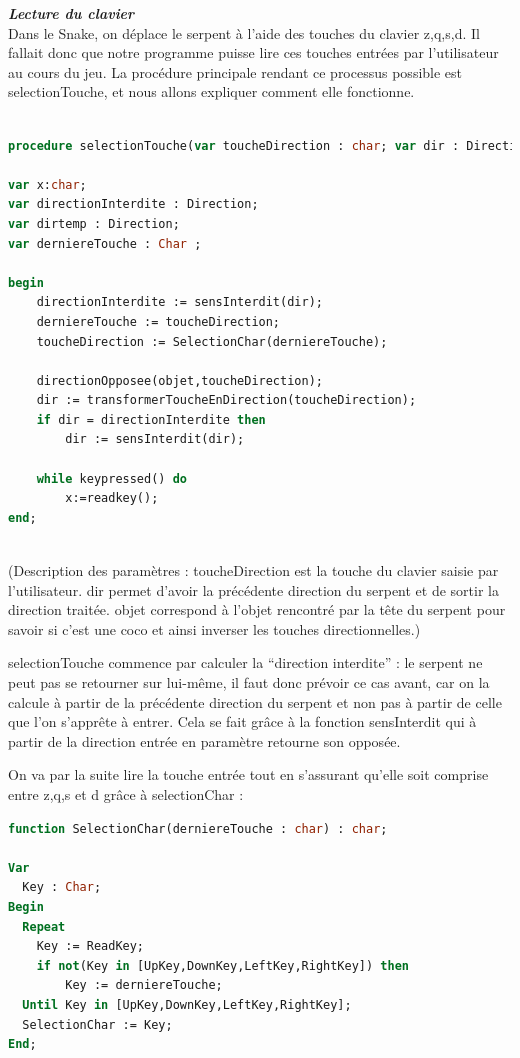 \documentclass[11pt,a4paper]{article}
\begin{document}
         \textit{\textbf{Lecture du clavier}}\\
        
        Dans le Snake, on déplace le serpent à l’aide des touches du clavier z,q,s,d. Il fallait donc que notre programme puisse lire ces touches entrées par l’utilisateur au cours du jeu. La procédure principale rendant ce processus possible est selectionTouche, et nous allons expliquer comment elle fonctionne.
        \scriptsize
                 \begin{lstlisting}[language=Pascal,frame=single,caption=Code source de la procédure selectionTouche]
                 
procedure selectionTouche(var toucheDirection : char; var dir : Direction; objet : Contenus);

var x:char;
var directionInterdite : Direction;
var dirtemp : Direction;
var derniereTouche : Char ;

begin
	directionInterdite := sensInterdit(dir); 
	derniereTouche := toucheDirection;
	toucheDirection := SelectionChar(derniereTouche);

	directionOpposee(objet,toucheDirection);							  
	dir := transformerToucheEnDirection(toucheDirection); 
	if dir = directionInterdite then 
		dir := sensInterdit(dir);	
		
	while keypressed() do 
		x:=readkey();	  
end;
                 
                \end{lstlisting}
         \normalsize

(Description des paramètres :         
toucheDirection est la touche du clavier saisie par l'utilisateur.
dir permet d'avoir la précédente direction du serpent et de sortir la direction traitée.
objet correspond à l'objet rencontré par la tête du serpent pour savoir si c'est une coco et ainsi inverser les touches directionnelles.)


selectionTouche commence par calculer la ``direction interdite'' : le serpent ne peut pas se retourner sur lui-même, il faut donc prévoir ce cas avant, car on la calcule à partir de la précédente direction du serpent et non pas à partir de celle que l'on s'apprête à entrer. Cela se fait grâce à la fonction sensInterdit qui à partir de la direction entrée en paramètre retourne son opposée.

On va par la suite lire la touche entrée tout en s'assurant qu'elle soit comprise entre z,q,s et d grâce à selectionChar :
         \normalsize
                 \begin{lstlisting}[language=Pascal,frame=single,caption=Code source de la procédure selectionChar]                 
function SelectionChar(derniereTouche : char) : char;

Var
  Key : Char;
Begin
  Repeat
    Key := ReadKey;
    if not(Key in [UpKey,DownKey,LeftKey,RightKey]) then 
		Key := derniereTouche;
  Until Key in [UpKey,DownKey,LeftKey,RightKey];
  SelectionChar := Key;
End;
                 \end{lstlisting}
                 
\end{document}

